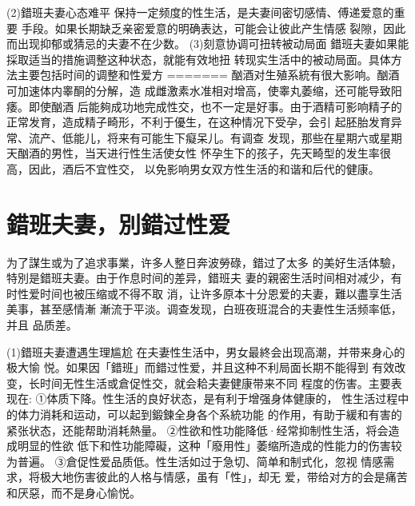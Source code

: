 \documentclass[12pt,UTF8]{ctexbook}
\begin{document}
(2)錯班夫妻心态难平
保持一定频度的性生活，是夫妻间密切感情、傅递爱意的重要
手段。如果长期缺乏亲密爱意的明确表达，可能会让彼此产生情感
裂隙，因此而出现抑郁或猜忌的夫妻不在少数。
(3)刻意协调可扭转被动局面
錯班夫妻如果能採取适当的措施调整这种状态，就能有效地扭
转现实生活中的被动局面。具体方法主要包括时间的调整和性爱方
=======
酗酒对生殖系統有很大影响。酗酒可加速体内睾酮的分解，造
成雌激素水准相对增高，使睾丸萎缩，还可能导致阳痿。即使酗酒
后能夠成功地完成性交，也不一定是好事。由于酒精可影响精子的
正常发育，造成精子畸形，不利于優生，在这种情况下受孕，会引
起胚胎发育异常、流产、低能儿，将来有可能生下癡呆儿。有调查
发现，那些在星期六或星期天酗酒的男性，当天进行性生活使女性
怀孕生下的孩子，先天畸型的发生率很高，因此，酒后不宜性交，
以免影响男女双方性生活的和谐和后代的健康。

\section{錯班夫妻，別錯过性爱}

为了謀生或为了追求事業，许多人整日奔波勞碌，錯过了太多
的美好生活体驗，特別是錯班夫妻。由于作息时间的差异，錯班夫
妻的親密生活时间相对减少，有时性爱时间也被压缩或不得不取
消，让许多原本十分恩爱的夫妻，難以盡享生活美事，甚至感情漸
漸流于平淡。调查发现，白班夜班混合的夫妻性生活频率低，并且
品质差。

(1)錯班夫妻遭遇生理尴尬
在夫妻性生活中，男女最終会出现高潮，并带来身心的极大愉
悦。如果因「錯班」而錯过性爱，并且这种不利局面长期不能得到
有效改变，长时间无性生活或倉促性交，就会耠夫妻健康带来不同
程度的伤害。主要表现在:
①体质下降。性生活的良好状态，是有利于增强身体健康的，
性生活过程中的体力消耗和运动，可以起到鍛鍊全身各个系統功能
的作用，有助于緩和有害的紧张状态，还能帮助消耗熱量。
②性欲和性功能降低·经常抑制性生活，将会造成明显的性欲
低下和性功能障礙，这种「廢用性」萎缩所造成的性能力的伤害较
为普遍。
③倉促性爱品质低。性生活如过于急切、简单和制式化，忽视
情感需求，将极大地伤害彼此的人格与情感，虽有「性」，却无
爱，带给对方的会是痛苦和厌惡，而不是身心愉悦。
\end{document}
